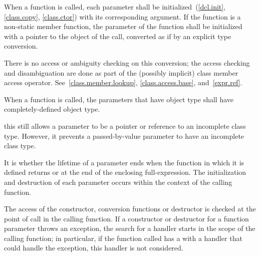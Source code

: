 \pnum
{}%
%
%
When a function is called, each parameter shall be
initialized~(\ref{dcl.init}, \ref{class.copy}, \ref{class.ctor}) with
its corresponding argument.
If the function is a non-static member
function, the  parameter of the function
shall be initialized with a pointer to the object of the call, converted
as if by an explicit type conversion.
\begin{note}
There is no access or ambiguity checking on this conversion; the access
checking and disambiguation are done as part of the (possibly implicit)
class member access operator.
See~\ref{class.member.lookup}, \ref{class.access.base},
and~\ref{expr.ref}.
\end{note}
When a function is called, the parameters that have object type shall
have completely-defined object type.
\begin{note}
this still allows a parameter to be a pointer or reference to an
incomplete class type. However, it prevents a passed-by-value parameter
to have an incomplete class type.
\end{note}
It is  whether the
lifetime of a parameter ends when the function in which it is defined
returns or at the end of the enclosing full-expression.
The initialization and destruction of each parameter occurs
within the context of the calling function.
\begin{example}
The access of the constructor, conversion functions or destructor is
checked at the point of call in the calling function. If a constructor
or destructor for a function parameter throws an exception, the search
for a handler starts in the scope of the calling function; in
particular, if the function called has a 
with a handler that could handle the exception,
this handler is not considered.
\end{example}

